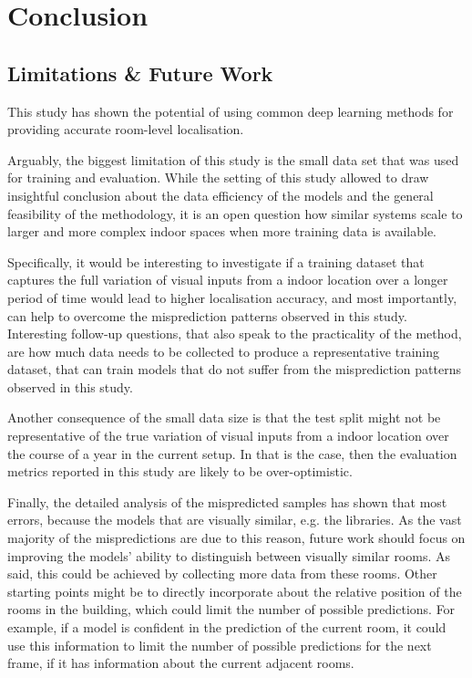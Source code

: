 \documentclass[a4paper]{article}
\begin{document}

\section{Conclusion}

\subsection{Limitations \& Future Work} %
\label{sub:limitations}

This study has shown the potential of using common deep learning methods for
providing accurate room-level localisation. 

Arguably, the biggest limitation of this study is the small data set that was
used for training and evaluation. While the setting of this study allowed to
draw insightful conclusion about the data efficiency of the models and the
general feasibility of the methodology, it is an open question how similar
systems scale to larger and more complex indoor spaces when more training data
is available.

Specifically, it would be interesting to investigate if a training dataset that
captures the full variation of visual inputs from a indoor location over a
longer period of time would lead to higher localisation accuracy, and most
importantly, can help to overcome the misprediction patterns observed in this
study. Interesting follow-up questions, that also speak to the practicality of
the method, are how much data needs to be collected to produce a representative
training dataset, that can train models that do not suffer from the
misprediction patterns observed in this study.

Another consequence of the small data size is that the test split might not
be representative of the true variation of visual inputs from a indoor location
over the course of a year in the current setup. In that is the case, then the
evaluation metrics reported in this study are likely to be over-optimistic.

Finally, the detailed analysis of the mispredicted samples has shown that most
errors, because the models that are visually similar, e.g. the libraries. As the
vast majority of the mispredictions are due to this reason, future work should
focus on improving the models' ability to distinguish between visually similar
rooms. As said, this could be achieved by collecting more data from these rooms.
Other starting points might be to directly incorporate about the relative
position of the rooms in the building, which could limit the number of possible
predictions. For example, if a model is confident in the prediction of the
current room, it could use this information to limit the number of possible
predictions for the next frame, if it has information about the current adjacent
rooms.
\end{document}
